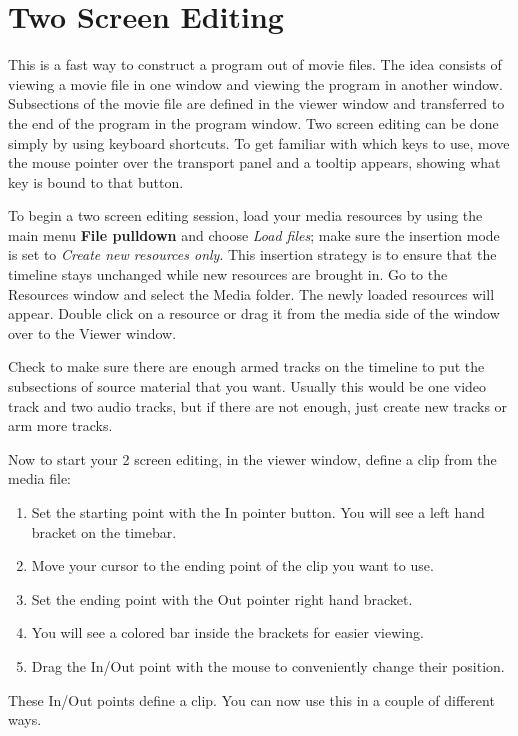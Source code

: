 \section{Two Screen Editing}%
\label{sec:two_screen_editing}

This is a fast way to construct a program out of movie files. The idea consists of viewing a movie file in one window and viewing the program in another window. Subsections of the movie file are defined in the viewer window and transferred to the end of the program in the program window.  Two screen editing can be done simply by using keyboard shortcuts.  To get familiar with which keys to use, move the mouse pointer over the transport panel and a tooltip appears, showing what key is bound to that button.

To begin a two screen editing session, load your media resources by using the main menu \textbf{File pulldown} and choose \textit{Load files}; make sure the insertion mode is set to \textit{Create new resources only}.  This insertion strategy is to ensure that the timeline stays unchanged while new resources are brought in. Go to the Resources window and select the Media folder. The newly loaded resources will appear. Double click on a resource or drag it from the media side of the window over to the Viewer window.

Check to make sure there are enough armed tracks on the timeline to put the subsections of source material that you want.  Usually this would be one video track and two audio tracks, but if there are not enough, just create new tracks or arm more tracks.

Now to start your 2 screen editing, in the viewer window, define a clip from the media file:

\begin{enumerate}
    \item Set the starting point with the In pointer button.  You will see a left hand bracket on the timebar.
    \item Move your cursor to the ending point of the clip you want to use.
    \item Set the ending point with the Out pointer right hand bracket.
    \item You will see a colored bar inside the brackets for easier viewing.
    \item Drag the In/Out point with the mouse to conveniently change their position.
\end{enumerate}

\noindent These In/Out points define a clip.  You can now use this in a couple of different ways.

